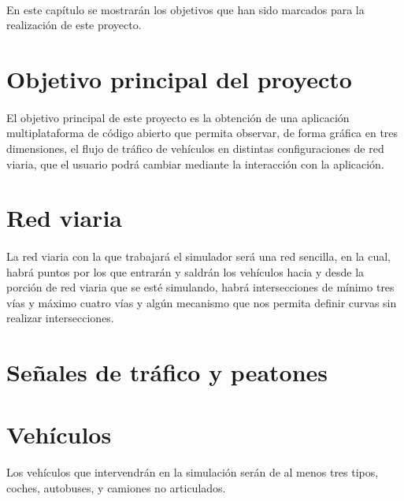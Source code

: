 	\paragraph{}
	En este capítulo se mostrarán los objetivos que han sido marcados para la realización de este proyecto.

\section{Objetivo principal del proyecto}

	\paragraph{}
	El objetivo principal de este proyecto es la obtención de una aplicación multiplataforma de código abierto que permita observar, de forma gráfica en tres dimensiones, el flujo de tráfico de vehículos en distintas configuraciones de red viaria, que el usuario podrá cambiar mediante la interacción con la aplicación.
	
\section{Red viaria}

	\paragraph{}
	La red viaria con la que trabajará el simulador será una red sencilla, en la cual, habrá puntos por los que entrarán y saldrán los vehículos hacia y desde la porción de red viaria que se esté simulando, habrá intersecciones de mínimo tres vías y máximo cuatro vías y algún mecanismo que nos permita definir curvas sin realizar intersecciones.

\section{Señales de tráfico y peatones}

	\paragraph{}
	
	
\section{Vehículos}
	
	\paragraph{}
	Los vehículos que intervendrán en la simulación serán de al menos tres tipos, coches, autobuses, y camiones no articulados.
	

